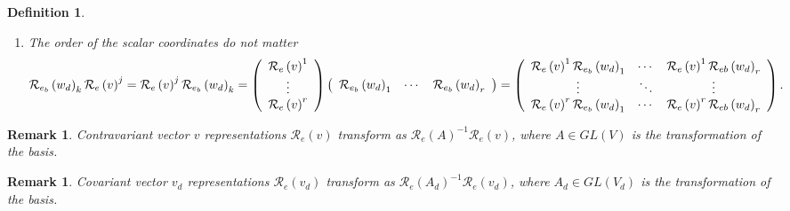 \documentclass[aps,preprint]{revtex4}%
\newtheorem{definition}[theorem]{Definition}
\newtheorem{remark}[theorem]{Remark}
\begin{document}
\begin{definition}
\begin{enumerate}
\begin{enumerate}
\item The order of the scalar coordinates do not matter%
\begin{equation}
\mathcal{R}_{e_{b}}\left(  w_{d}\right)  _{k}\mathcal{R}_{e}\left(  v\right)
^{j}=\mathcal{R}_{e}\left(  v\right)  ^{j}\mathcal{R}_{e_{b}}\left(
w_{d}\right)  _{k}=\left(
\begin{array}
[c]{c}%
\mathcal{R}_{e}\left(  v\right)  ^{1}\\
\vdots\\
\mathcal{R}_{e}\left(  v\right)  ^{r}%
\end{array}
\right)  \left(
\begin{array}
[c]{ccc}%
\mathcal{R}_{e_{b}}\left(  w_{d}\right)  _{1} & \cdots & \mathcal{R}_{e_{b}%
}\left(  w_{d}\right)  _{r}%
\end{array}
\right)  =\left(
\begin{array}
[c]{ccc}%
\mathcal{R}_{e}\left(  v\right)  ^{1}\mathcal{R}_{e_{b}}\left(  w_{d}\right)
_{1} & \cdots & \mathcal{R}_{e}\left(  v\right)  ^{1}\mathcal{R}_{eb}\left(
w_{d}\right)  _{r}\\
\vdots & \ddots & \vdots\\
\mathcal{R}_{e}\left(  v\right)  ^{r}\mathcal{R}_{e_{b}}\left(  w_{d}\right)
_{1} & \cdots & \mathcal{R}_{e}\left(  v\right)  ^{r}\mathcal{R}_{eb}\left(
w_{d}\right)  _{r}%
\end{array}
\right)  .
\end{equation}

\end{enumerate}
\end{enumerate}
\end{definition}

\begin{remark}
\emph{Contravariant} vector $v$ representations $\mathcal{R}_{e}\left(
v\right)  $ transform as $\mathcal{R}_{e}\left(  A\right)  ^{-1}%
\mathcal{R}_{e}\left(  v\right)  $, where $A\in GL\left(  V\right)  $ is the
transformation of the basis.
\end{remark}

\begin{remark}
\emph{Covariant} vector $v_{d}$ representations $\mathcal{R}_{e}\left(
v_{d}\right)  $ transform as $\mathcal{R}_{e}\left(  A_{d}\right)
^{-1}\mathcal{R}_{e}\left(  v_{d}\right)  $, where $A_{d}\in GL\left(
V_{d}\right)  $ is the transformation of the basis.
\end{remark}
\end{document}
